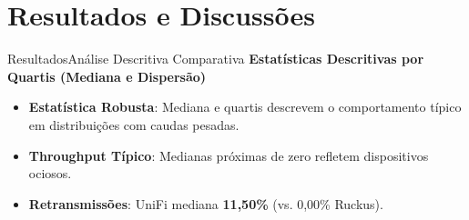 \documentclass[10pt,brazil]{beamer}
\newcommand{\nologo}{\setbeamertemplate{logo}{}}
\begin{document}
    \section{Resultados e Discussões}
    \nologo
    \begin{frame}{Resultados}{Análise Descritiva Comparativa}
        \centering
        \scriptsize \textbf{Estatísticas Descritivas por Quartis (Mediana e Dispersão)}\\[0.2cm]
        \scriptsize
        \begin{itemize}
            \item \textbf{Estatística Robusta}: Mediana e quartis descrevem o comportamento típico em distribuições com caudas pesadas.
            \item \textbf{Throughput Típico}: Medianas próximas de zero refletem dispositivos ociosos.
            \item \textbf{Retransmissões}: UniFi mediana \textbf{11,50\%} (vs. 0,00\% Ruckus).
        \end{itemize}
    \end{frame}
\end{document}
